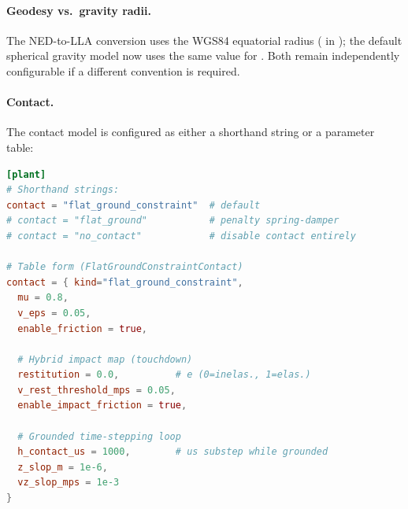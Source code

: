 \paragraph{Geodesy vs.\ gravity radii.}
The NED-to-LLA conversion uses the WGS84 equatorial radius ( in ); the default spherical gravity model now uses the same value for . Both remain independently configurable if a different convention is required.

\paragraph{Contact.}
The contact model is configured as either a shorthand string or a parameter table:
\begin{lstlisting}[language=toml]
[plant]
# Shorthand strings:
contact = "flat_ground_constraint"  # default
# contact = "flat_ground"           # penalty spring-damper
# contact = "no_contact"            # disable contact entirely

# Table form (FlatGroundConstraintContact)
contact = { kind="flat_ground_constraint",
  mu = 0.8,
  v_eps = 0.05,
  enable_friction = true,

  # Hybrid impact map (touchdown)
  restitution = 0.0,          # e (0=inelas., 1=elas.)
  v_rest_threshold_mps = 0.05,
  enable_impact_friction = true,

  # Grounded time-stepping loop
  h_contact_us = 1000,        # us substep while grounded
  z_slop_m = 1e-6,
  vz_slop_mps = 1e-3
}
\end{lstlisting}


